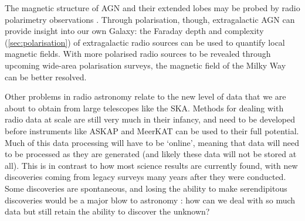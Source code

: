    The magnetic structure of AGN and their extended lobes may be probed by radio polarimetry observations \citep{anderson_broadband_2015,grant11polarised}. Through polarisation, though, extragalactic AGN can provide insight into our own Galaxy: the Faraday depth and complexity (\autoref{sec:polarisation}) of extragalactic radio sources can be used to quantify local magnetic fields. With more polarised radio sources to be revealed through upcoming wide-area polarisation surveys, the magnetic field of the Milky Way can be better resolved.

    Other problems in radio astronomy relate to the new level of data that we are about to obtain from large telescopes like the SKA. Methods for dealing with radio data at scale are still very much in their infancy, and need to be developed before instruments like ASKAP and MeerKAT can be used to their full potential. Much of this data processing will have to be `online', meaning that data will need to be processed as they are generated (and likely these data will not be stored at all). This is in contrast to how most science results are currently found, with new discoveries coming from legacy surveys many years after they were conducted. Some discoveries are spontaneous, and losing the ability to make serendipitous discoveries would be a major blow to astronomy \citep{norris17unexpected}: how can we deal with so much data but still retain the ability to discover the unknown?

